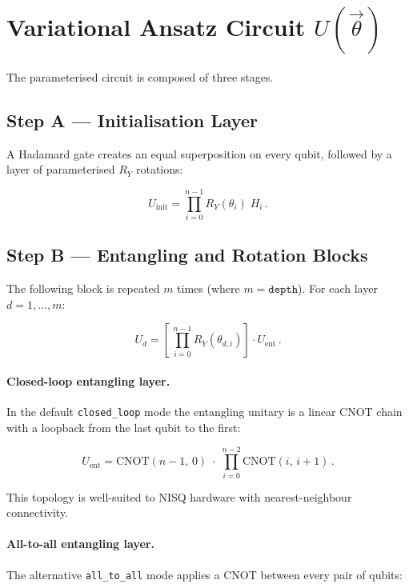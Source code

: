 \documentclass[11pt,a4paper]{article}
\begin{document}
\section{Variational Ansatz Circuit \texorpdfstring{$U(\vec\theta)$}{U(theta)}}

The parameterised circuit is composed of three stages.

\subsection{Step A --- Initialisation Layer}

A Hadamard gate creates an equal superposition on every qubit, followed by a
layer of parameterised $R_Y$ rotations:

\begin{equation}
  U_{\mathrm{init}}
    = \prod_{i=0}^{n-1} R_Y(\theta_i)\; H_i\,.
\end{equation}

\subsection{Step B --- Entangling and Rotation Blocks}

The following block is repeated $m$ times (where $m = \texttt{depth}$). For
each layer $d = 1, \dots, m$:

\begin{equation}
  U_d
    = \left[\,\prod_{i=0}^{n-1} R_Y(\theta_{d,i})\right]
      \cdot U_{\mathrm{ent}}\,.
\end{equation}

\paragraph{Closed-loop entangling layer.}
In the default \texttt{closed\_loop} mode the entangling unitary is a linear
CNOT chain with a loopback from the last qubit to the first:

\begin{equation}
  U_{\mathrm{ent}}
    = \mathrm{CNOT}(n{-}1,\,0)
      \;\cdot\; \prod_{i=0}^{n-2} \mathrm{CNOT}(i,\,i{+}1)\,.
\end{equation}

This topology is well-suited to NISQ hardware with nearest-neighbour
connectivity.

\paragraph{All-to-all entangling layer.}
The alternative \texttt{all\_to\_all} mode applies a CNOT between every pair of
qubits:
\end{document}
